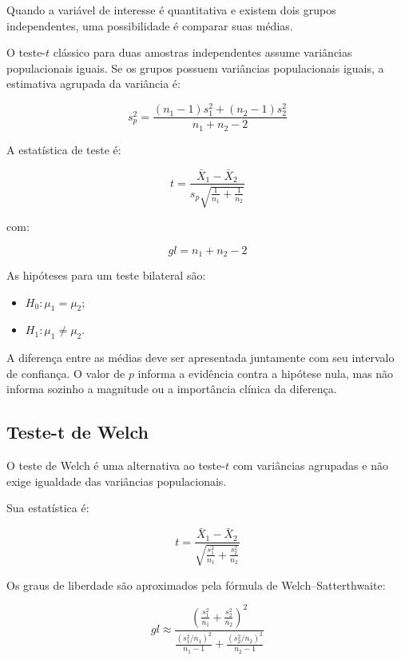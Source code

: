Quando a variável de interesse é quantitativa e existem dois grupos
independentes, uma possibilidade é comparar suas médias.

O teste-$t$ clássico para duas amostras independentes assume variâncias
populacionais iguais. Se os grupos possuem variâncias populacionais iguais, a estimativa agrupada
da variância é:

\begin{equation}
  s_p^2=
  \frac{
  (n_1-1)s_1^2+(n_2-1)s_2^2
  }{
  n_1+n_2-2
  }
\end{equation}

A estatística de teste é:

\begin{equation}
  t=
  \frac{\bar X_1-\bar X_2}
  {s_p\sqrt{\frac{1}{n_1}+\frac{1}{n_2}}}
\end{equation}

com:

\begin{equation}
  gl=n_1+n_2-2
\end{equation}

As hipóteses para um teste bilateral são:

\begin{itemize}
    \item $H_0:\mu_1=\mu_2$;
    \item $H_1:\mu_1\neq\mu_2$.
\end{itemize}

A diferença entre as médias deve ser apresentada juntamente com seu intervalo
de confiança. O valor de $p$ informa a evidência contra a hipótese nula, mas
não informa sozinho a magnitude ou a importância clínica da diferença.

\subsection{Teste-t de Welch}

O teste de Welch é uma alternativa ao teste-$t$ com variâncias agrupadas e
não exige igualdade das variâncias populacionais.

Sua estatística é:

\begin{equation}
  t=
\frac{\bar X_1-\bar X_2}
{\sqrt{\frac{s_1^2}{n_1}+\frac{s_2^2}{n_2}}}
\end{equation}

Os graus de liberdade são aproximados pela fórmula de Welch--Satterthwaite:

\begin{equation}
gl \approx
\frac{
\left(
\frac{s_1^2}{n_1}+
\frac{s_2^2}{n_2}
\right)^2
}{
\frac{
(s_1^2/n_1)^2
}{n_1-1}
+
\frac{
(s_2^2/n_2)^2
}{n_2-1}
}
\end{equation}

